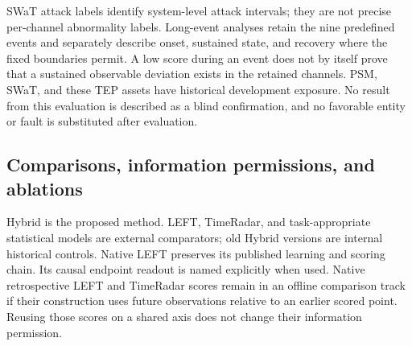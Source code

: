 \documentclass[
  english,
]{article}
\begin{document}
SWaT attack labels identify system-level attack intervals; they are not
precise per-channel abnormality labels. Long-event analyses retain the
nine predefined events and separately describe onset, sustained state,
and recovery where the fixed boundaries permit. A low score during an
event does not by itself prove that a sustained observable deviation
exists in the retained channels. PSM, SWaT, and these TEP assets have
historical development exposure. No result from this evaluation is
described as a blind confirmation, and no favorable entity or fault is
substituted after evaluation.

\subsection{Comparisons, information permissions, and
ablations}\label{comparisons-information-permissions-and-ablations}

Hybrid is the proposed method. LEFT, TimeRadar, and task-appropriate
statistical models are external comparators; old Hybrid versions are
internal historical controls. Native LEFT preserves its published
learning and scoring chain. Its causal endpoint readout is named
explicitly when used. Native retrospective LEFT and TimeRadar scores
remain in an offline comparison track if their construction uses future
observations relative to an earlier scored point. Reusing those scores
on a shared axis does not change their information permission.
\end{document}
